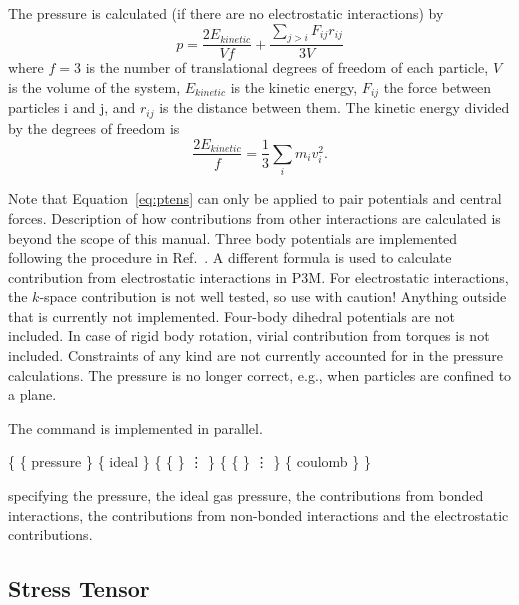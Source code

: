The pressure is calculated (if there are no electrostatic interactions) by 
\begin{equation}
\label{eq:ptens}
  p = \frac{2E_{kinetic}}{Vf} + \frac{\sum_{j>i} {F_{ij}r_{ij}}}{3V}
\end{equation}
where $f=3$ is the number of translational degrees of freedom of each particle, $V$
is the volume of the system, $E_{kinetic}$ is the kinetic energy, $F_{ij}$ the force between
particles i and j, and $r_{ij}$ is the distance between them.  The kinetic energy divided by the
degrees of freedom is
\begin{equation}
\frac{2E_{kinetic}}{f} = \frac{1}{3}\sum_{i} {m_{i}v_{i}^{2}}.
\end {equation}

Note that Equation~\ref{eq:ptens} can only be applied to pair potentials and central forces.
Description of how contributions from other interactions are calculated is beyond the scope
of this manual. Three body potentials are implemented following the procedure in 
Ref.~\cite{thompson09a}.
A different formula is used to calculate contribution from electrostatic interactions 
in P3M. For electrostatic interactions, the $k$-space contribution is not 
well tested, so use with caution!
Anything outside that is currently not implemented.
Four-body dihedral potentials are not included.
In case of rigid body rotation, virial contribution from torques is not included.
Constraints of any kind are not currently accounted for in the pressure calculations. 
The pressure is no longer correct, e.g., when particles are confined to a plane.

The command is implemented in parallel.


\begin{code}
\{ \{ pressure  \}
   \{ ideal  \} 
   \{ \{   \}
      \vdots
   \}
   \{ \{   \}
      \vdots
   \}
   \{ coulomb  \}
\}
\end{code}
specifying the pressure, the ideal gas pressure, the
contributions from bonded interactions, the contributions from
non-bonded interactions and the electrostatic contributions.


\subsection{Stress Tensor}
\label{analyze:stresstensor}


